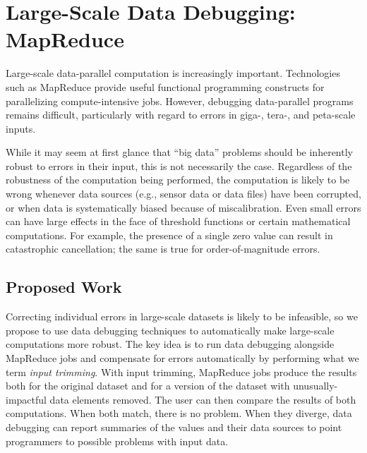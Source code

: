 \section{Large-Scale Data Debugging: MapReduce}

Large-scale data-parallel computation is increasingly important.
Technologies such as MapReduce provide useful functional programming
constructs for parallelizing compute-intensive jobs.  However,
debugging data-parallel programs remains difficult, particularly with
regard to errors in giga-, tera-, and peta-scale inputs. 

While it may seem at first glance that ``big data'' problems should be
inherently robust to errors in their input, this is not necessarily
the case. Regardless of the robustness of the computation being
performed, the computation is likely to be wrong whenever data sources
(e.g., sensor data or data files) have been corrupted, or when data is
systematically biased because of miscalibration. Even small errors can
have large effects in the face of threshold functions or certain
mathematical computations. For example, the presence of a single zero
value can result in catastrophic cancellation; the same is true for
order-of-magnitude errors.

\subsection{Proposed Work}

Correcting individual errors in large-scale datasets is likely
to be infeasible, so we propose to use data debugging techniques to
automatically make large-scale computations more robust. The key idea
is to run data debugging alongside MapReduce jobs and compensate for
errors automatically by performing what we term \emph{input
  trimming}. With input trimming, MapReduce jobs produce the results
both for the original dataset and for a version of the dataset with
unusually-impactful data elements removed. The user can then compare
the results of both computations. When both match, there is no
problem. When they diverge, data debugging can report summaries of the
values and their data sources to point programmers to possible
problems with input data.


